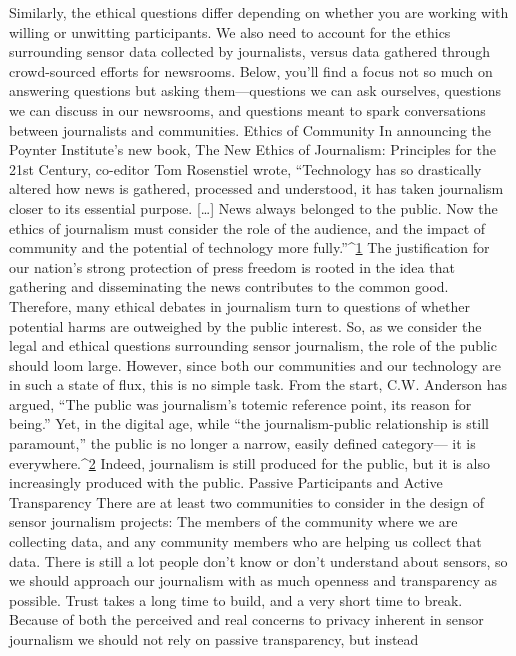 Similarly, the ethical questions differ depending on whether you are working
with willing or unwitting participants. We also need to account for the
ethics surrounding sensor data collected by journalists, versus data gathered
through crowd-sourced efforts for newsrooms. Below, you'll find a
focus not so much on answering questions but asking them—questions we
can ask ourselves, questions we can discuss in our newsrooms, and questions
meant to spark conversations between journalists and communities.
Ethics of Community
In announcing the Poynter Institute's new book, The New Ethics of Journalism:
Principles for the 21st Century, co-editor Tom Rosenstiel wrote, ``Technology
has so drastically altered how news is gathered, processed and
understood, it has taken journalism closer to its essential purpose. […]
News always belonged to the public. Now the ethics of journalism must
consider the role of the audience, and the impact of community and the
potential of technology more fully.''^{\href{#endnotes-stearns}{1}}
The justification for our nation's strong protection of press freedom is
rooted in the idea that gathering and disseminating the news contributes
to the common good. Therefore, many ethical debates in journalism turn to
questions of whether potential harms are outweighed by the public interest.
So, as we consider the legal and ethical questions surrounding sensor
journalism, the role of the public should loom large.
However, since both our communities and our technology are in such a
state of flux, this is no simple task. From the start, C.W. Anderson has
argued, ``The public was journalism's totemic reference point, its reason for
being.'' Yet, in the digital age, while ``the journalism-public relationship is
still paramount,'' the public is no longer a narrow, easily defined category—
it is everywhere.^{\href{#endnotes-stearns}{2}} Indeed, journalism is still produced for the public, but it is
also increasingly produced with the public.
Passive Participants and Active Transparency
There are at least two communities to consider in the design of sensor journalism
projects: The members of the community where we are collecting
data, and any community members who are helping us collect that data.
There is still a lot people don't know or don't understand about sensors, so
we should approach our journalism with as much openness and transparency
as possible. Trust takes a long time to build, and a very short time to
break. Because of both the perceived and real concerns to privacy inherent
in sensor journalism we should not rely on passive transparency, but instead
